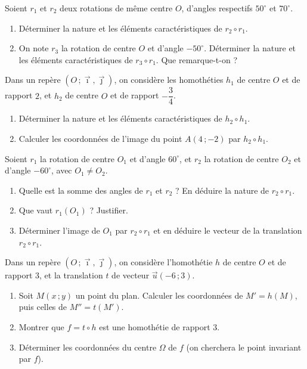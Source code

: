 \documentclass[11pt]{article}
\newcounter{popsec}
\newcounter{popsub}
\newcommand{\courssub}[1]{%
  \stepcounter{popsub}%
  \par\vspace{9pt}\noindent{\popxbold\fontsize{11.5}{13}\selectfont\color{popink}{\color{poporange}\thepopsec.\thepopsub}\hspace{6pt}#1}\par\nopagebreak\vspace{4pt}
}
\begin{document}
\begin{exercice}
Soient $r_1$ et $r_2$ deux rotations de même centre $O$, d'angles respectifs $50^{\circ}$ et $70^{\circ}$.
\begin{enumerate}
\item Déterminer la nature et les éléments caractéristiques de $r_2\circ r_1$.
\item On note $r_3$ la rotation de centre $O$ et d'angle $-50^{\circ}$. Déterminer la nature et les éléments caractéristiques de $r_3\circ r_1$. Que remarque-t-on ?
\end{enumerate}
\end{exercice}

\begin{exercice}
Dans un repère $(O\,;\vec{\imath},\vec{\jmath})$, on considère les homothéties $h_1$ de centre $O$ et de rapport $2$, et $h_2$ de centre $O$ et de rapport $-\dfrac{3}{4}$.
\begin{enumerate}
\item Déterminer la nature et les éléments caractéristiques de $h_2\circ h_1$.
\item Calculer les coordonnées de l'image du point $A(4\,;-2)$ par $h_2\circ h_1$.
\end{enumerate}
\end{exercice}

\courssub{Je m'entraîne}

\begin{exercice}
Soient $r_1$ la rotation de centre $O_1$ et d'angle $60^{\circ}$, et $r_2$ la rotation de centre $O_2$ et d'angle $-60^{\circ}$, avec $O_1\neq O_2$.
\begin{enumerate}
\item Quelle est la somme des angles de $r_1$ et $r_2$ ? En déduire la nature de $r_2\circ r_1$.
\item Que vaut $r_1(O_1)$ ? Justifier.
\item Déterminer l'image de $O_1$ par $r_2\circ r_1$ et en déduire le vecteur de la translation $r_2\circ r_1$.
\end{enumerate}
\end{exercice}

\begin{exercice}
Dans un repère $(O\,;\vec{\imath},\vec{\jmath})$, on considère l'homothétie $h$ de centre $O$ et de rapport $3$, et la translation $t$ de vecteur $\vec{u}(-6\,;3)$.
\begin{enumerate}
\item Soit $M(x\,;y)$ un point du plan. Calculer les coordonnées de $M'=h(M)$, puis celles de $M''=t(M')$.
\item Montrer que $f=t\circ h$ est une homothétie de rapport $3$.
\item Déterminer les coordonnées du centre $\Omega$ de $f$ (on cherchera le point invariant par $f$).
\end{enumerate}
\end{exercice}
\end{document}
